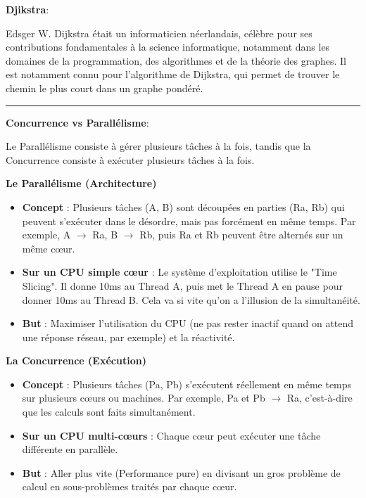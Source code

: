 \vspace{0.5cm}

\noindent \textbf{Djikstra}:

\noindent Edsger W. Dijkstra était un informaticien néerlandais, célèbre pour ses contributions fondamentales à la science informatique, notamment dans les domaines de la programmation, des algorithmes et de la théorie des graphes. Il est notamment connu pour l'algorithme de Dijkstra, qui permet de trouver le chemin le plus court dans un graphe pondéré.

\begin{center}
\rule{5cm}{0.4pt}
\end{center}

\vspace{0.5cm}

\noindent \textbf{Concurrence vs Parallélisme}:

\noindent Le Parallélisme consiste à gérer plusieurs tâches à la fois, tandis que la Concurrence consiste à exécuter plusieurs tâches à la fois.

\noindent \textbf{Le Parallélisme (Architecture)}
\begin{itemize}
    \item \textbf{Concept} : Plusieurs tâches (A, B) sont découpées en parties (Ra, Rb) qui peuvent s'exécuter dans le désordre, mais pas forcément en même temps. Par exemple, A $\rightarrow$ Ra, B $\rightarrow$ Rb, puis Ra et Rb peuvent être alternés sur un même cœur.
    \item \textbf{Sur un CPU simple cœur} : Le système d'exploitation utilise le "Time Slicing". Il donne 10ms au Thread A, puis met le Thread A en pause pour donner 10ms au Thread B. Cela va si vite qu'on a l'illusion de la simultanéité.
    \item \textbf{But} : Maximiser l'utilisation du CPU (ne pas rester inactif quand on attend une réponse réseau, par exemple) et la réactivité.
\end{itemize}

\noindent \textbf{La Concurrence (Exécution)}
\begin{itemize}
    \item \textbf{Concept} : Plusieurs tâches (Pa, Pb) s'exécutent réellement en même temps sur plusieurs cœurs ou machines. Par exemple, Pa et Pb $\rightarrow$ Ra, c'est-à-dire que les calculs sont faits simultanément.
    \item \textbf{Sur un CPU multi-cœurs} : Chaque cœur peut exécuter une tâche différente en parallèle.
    \item \textbf{But} : Aller plus vite (Performance pure) en divisant un gros problème de calcul en sous-problèmes traités par chaque cœur.
\end{itemize}

